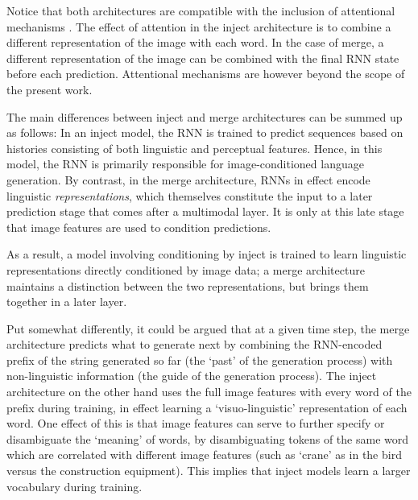 \documentclass[11pt,letterpaper]{article}
\begin{document}
Notice that both architectures are compatible with the inclusion of attentional mechanisms \cite{Xu2015}. The effect of attention in the inject architecture is to combine a different representation of the image with each word. In the case of merge, a different representation of the image can be combined with the final RNN state before each prediction. Attentional mechanisms are however beyond the scope of the present work.

The main differences between inject and merge architectures can be summed up as follows: In an inject model, the RNN is trained to predict sequences based on histories consisting of both linguistic and perceptual features. Hence, in this model, the RNN is primarily responsible for image-conditioned language generation. By contrast, in the merge architecture, RNNs in effect encode linguistic {\em representations}, which themselves constitute the input to a later prediction stage that comes after a multimodal layer. It is only at this late stage that image features are used to condition predictions.

As a result, a model involving conditioning by inject is trained to learn linguistic representations directly conditioned by image data; a merge architecture maintains a distinction between the two representations, but brings them together in a later layer.

Put somewhat differently, it could be argued that at a given time step, the merge architecture predicts what to generate next by combining the RNN-encoded prefix of the string generated so far (the `past' of the generation process) with non-linguistic information (the guide of the generation process). The inject architecture on the other hand uses the full image features with every word of the prefix during training, in effect learning a `visuo-linguistic' representation of each word. One effect of this is that image features can serve to further specify or disambiguate the `meaning' of words, by disambiguating tokens of the same word which are correlated with different image features (such as `crane' as in the bird versus the construction equipment). This implies that inject models learn a larger vocabulary during training.
\end{document}
